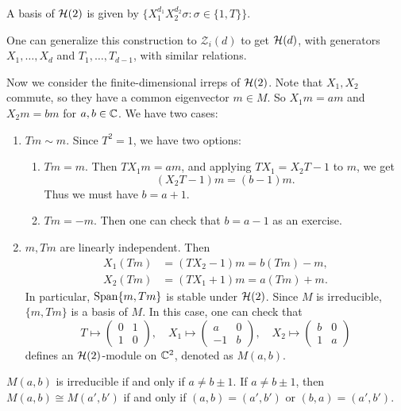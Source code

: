 \begin{remark}
  A basis of $\mathcal{H}(2)$ is
  given by
  $\{X_1^{d_1} X_2^{d_2} \sigma : \sigma \in \{1, T\}\}$.
\end{remark}

\begin{remark}
  One can generalize this construction
  to $\mathcal{Z}_{i}(d)$ to get
  $\mathcal{H}(d)$, with
  generators $X_1, \ldots, X_d$ and
  $T_1, \ldots, T_{d - 1}$, with similar
  relations.
\end{remark}

\begin{remark}
  Now we consider the finite-dimensional
  irreps of $\mathcal{H}(2)$. Note that
  $X_1, X_2$ commute, so they have a
  common eigenvector $m \in M$. So
  $X_1 m = a m$ and $X_2 m = b m$
  for $a, b \in \mathbb{C}$. We have two cases:
  \begin{enumerate}
    \item $Tm \sim m$. Since $T^2 = 1$,
      we have two options:
      \begin{enumerate}
        \item $Tm = m$. Then
          $T X_1 m = a m$, and applying
          $T X_1 = X_2 T - 1$ to $m$, we get
          \[
            (X_2 T - 1) m = (b - 1) m.
          \]
          Thus we must have $b = a + 1$.
        \item $Tm = -m$. Then
          one can check that $b = a - 1$
          as an exercise.
      \end{enumerate}
    \item $m, Tm$ are linearly independent.
      Then
      \begin{align*}
        X_1 (Tm) &= (T X_2 - 1)m
        = b(Tm) - m, \\
        X_2 (Tm) &= (T X_1 + 1)m
        = a(Tm) + m.
      \end{align*}
      In particular, $\operatorname{Span}\{m, Tm\}$
      is stable under $\mathcal{H}(2)$.
      Since $M$ is irreducible,
      $\{m, Tm\}$ is a basis of $M$.
      In this case, one can check that
      \[
        T \mapsto
        \begin{pmatrix}
          0 & 1 \\
          1 & 0
        \end{pmatrix}, \quad
        X_1 \mapsto
        \begin{pmatrix}
          a & 0 \\
          -1 & b
        \end{pmatrix}, \quad
        X_2 \mapsto
        \begin{pmatrix}
          b & 0 \\
          1 & a
        \end{pmatrix}
      \]
      defines an $\mathcal{H}(2)$-module on
      $\mathbb{C}^2$, denoted as $M(a, b)$.
  \end{enumerate}
\end{remark}

\begin{lemma}
  $M(a, b)$ is irreducible if and only if
  $a \ne b \pm 1$. If
  $a \ne b \pm 1$, then
  $M(a, b) \cong M(a', b')$ if and only
  if $(a, b) = (a', b')$ or
  $(b, a) = (a', b')$.
\end{lemma}
